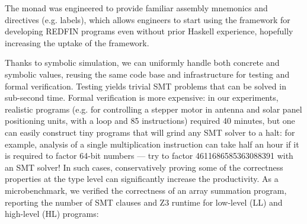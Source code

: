 
The  monad was engineered to provide familiar assembly mnemonics and
directives (e.g. labels), which allows engineers to start
using the framework for developing REDFIN programs even without prior Haskell
experience, hopefully increasing the uptake of the framework.

Thanks to symbolic simulation, we can uniformly handle both concrete and
symbolic values, reusing the same code base and infrastructure for testing and
formal verification.
Testing yields trivial SMT problems that can be solved in sub-second time.
Formal verification is more expensive: in our experiments,
realistic programs (e.g. for controlling a stepper motor in antenna and solar
panel positioning units, with a loop and 85 instructions)
required 40 minutes, but one
can easily construct tiny programs that will grind any SMT solver to a halt:
for example, analysis of a single multiplication instruction can take half an
hour if it is required to factor 64-bit numbers --- try to factor
4611686585363088391 with an SMT solver! In such cases, conservatively proving
some of the correctness properties at the type level can significantly increase
the productivity. As a microbenchmark, we verified the correctness of an array
summation program, reporting the number of SMT clauses and Z3 runtime for
low-level (LL) and high-level (HL) programs:

